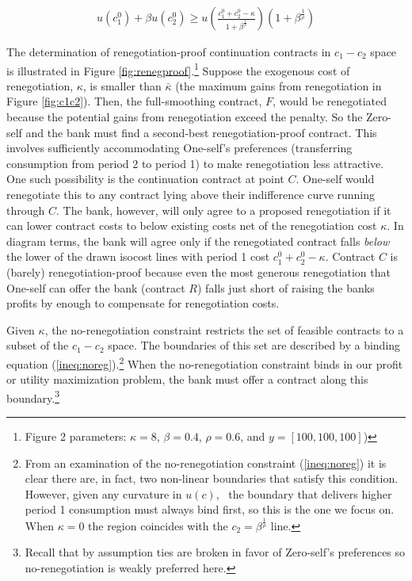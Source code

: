 \documentclass[11pt,english]{article}
\theoremstyle{plain}
\theoremstyle{definition}
\begin{document}
\begin{align}
u(c_{1}^{0})+\beta u(c_{2}^{0})\ge u\left(\frac{c_{1}^{0}+c_{2}^{0}-\kappa}{1+\beta^{\frac{1}{\rho}}}\right)(1+\beta^{\frac{1}{\rho}})\label{ineq:noreg}
\end{align}

The determination of renegotiation-proof continuation contracts in $c_{1}-c_{2}$ space is illustrated in Figure \ref{fig:renegproof}.\footnote{Figure 2 parameters: $\kappa=8$, $\beta=0.4$, $\rho=0.6$, and $y=[100, 100, 100]$)} Suppose the exogenous cost of renegotiation, $\kappa$, is smaller than $\bar{\kappa}$ (the maximum gains from renegotiation in Figure \ref{fig:c1c2}). Then, the full-smoothing contract, $F$, would be renegotiated because the potential gains from renegotiation exceed the penalty.
So the Zero-self and the bank must find a second-best renegotiation-proof contract. This involves sufficiently accommodating One-self's preferences (transferring consumption from period 2 to period 1) to make renegotiation less attractive. One such possibility is the continuation contract at point $C$. One-self would renegotiate this to any contract lying above their indifference
curve running through $C$. The bank, however, will only agree to a proposed renegotiation if it can lower contract costs to below existing costs net of the renegotiation cost $\kappa.$ In diagram terms, the
bank will agree only if the renegotiated contract falls \textit{below} the lower of the drawn isocost lines with period 1 cost $c_{1}^{0}+c_{2}^{0}-\kappa$.
Contract $C$ is (barely) renegotiation-proof because even the most generous renegotiation that One-self can offer the bank (contract $R$) falls just short of raising the banks profits by enough to compensate for renegotiation costs.

Given $\kappa$, the no-renegotiation constraint restricts the set of feasible contracts to a subset of the $c_{1}-c_{2}$ space. The boundaries of this set are described by a binding equation (\ref{ineq:noreg}).\footnote{From  an examination of the no-renegotiation constraint
(\ref{ineq:noreg}) it is clear there are, in fact, two non-linear boundaries that satisfy this condition. However, given any curvature in \(u(c), \text{ } \)the boundary that delivers higher period 1 consumption must always bind first, so this is the one we focus on.
When $\kappa=0$ the region coincides with the $c_{2}=\beta^{\frac{1}{\rho}}$
line.} When the no-renegotiation
constraint binds in our profit or utility maximization problem, the
bank must offer a contract along this boundary.\footnote{Recall that by assumption ties are broken in favor of Zero-self's
preferences so no-renegotiation is weakly preferred here. } 
\end{document}
